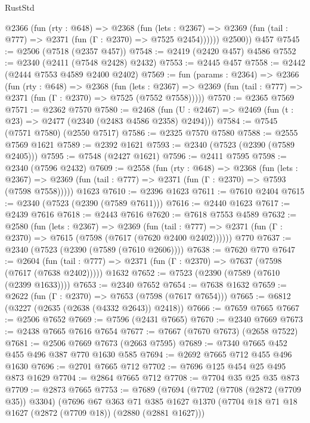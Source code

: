 \begin{lexlean}{RustStd}
\begin{coremodule}
          @2366
            (fun (rty : @648) =>
            @2368
              (fun (lets : @2367) =>
              @2369 (fun (tail : @777) => @2371 (fun (Γ : @2370) => @7525 @2454))))))
        @2500))
    @457
@7545 := @2506 (@7518 (@2357 @457))
@7548 := @2419 (@2420 @457) @4586
@7552 := @2340 (@2411 (@7548 @2428) @2432)
@7553 := @2445 @457
@7558 := @2442 (@2444 @7553 @4589 @2400 @2402)
@7569 := fun (params : @2364) =>
  @2366
    (fun (rty : @648) =>
    @2368
      (fun (lets : @2367) =>
      @2369 (fun (tail : @777) => @2371 (fun (Γ : @2370) => @7525 (@7552 @7558)))))
@7570 := @2365 @7569
@7571 := @2362 @7570
@7580 := @2468 (fun (U : @2467) => @2469 (fun (t : @23) => @2477 (@2340 (@2483 @4586 @2358) @2494)))
@7584 := @7545 (@7571 @7580) (@2550 @7517)
@7586 := @2325 @7570 @7580
@7588 := @2555 @7569 @1621
@7589 := @2392 @1621
@7593 := @2340 (@7523 (@2390 (@7589 @2405)))
@7595 := @7548 (@2427 @1621)
@7596 := @2411 @7595
@7598 := @2340 (@7596 @2432)
@7609 := @2558
    (fun (rty : @648) =>
    @2368
      (fun (lets : @2367) =>
      @2369 (fun (tail : @777) => @2371 (fun (Γ : @2370) => @7593 (@7598 @7558)))))
    @1623
@7610 := @2396 @1623
@7611 := @7610 @2404
@7615 := @2340 (@7523 (@2390 (@7589 @7611)))
@7616 := @2440 @1623
@7617 := @2439 @7616
@7618 := @2443 @7616
@7620 := @7618 @7553 @4589
@7632 := @2580
    (fun (lets : @2367) =>
    @2369
      (fun (tail : @777) => @2371 (fun (Γ : @2370) => @7615 (@7598 (@7617 (@7620 @2400 @2402))))))
    @770
@7637 := @2340 (@7523 (@2390 (@7589 (@7610 @2606))))
@7638 := @7620 @770
@7647 := @2604
    (fun (tail : @777) => @2371 (fun (Γ : @2370) => @7637 (@7598 (@7617 (@7638 @2402)))))
    @1632
@7652 := @7523 (@2390 (@7589 (@7610 (@2399 @1633))))
@7653 := @2340 @7652
@7654 := @7638 @1632
@7659 := @2622 (fun (Γ : @2370) => @7653 (@7598 (@7617 @7654)))
@7665 := @6812 (@3227 (@2635 (@2638 (@4332 @2643)) @2418))
@7666 := @7659 @7665
@7667 := @2506 @7652
@7669 := @7596 (@2431 @7665)
@7670 := @2340 @7669
@7673 := @2438 @7665 @7616 @7654
@7677 := @7667 (@7670 @7673) (@2658 @7522)
@7681 := @2506 @7669 @7673 (@2663 @7595)
@7689 := @7340 @7665 @452 @455 @496 @387 @770 @1630 @585
@7694 := @2692 @7665 @712 @455 @496 @1630
@7696 := @2701 @7665 @712
@7702 := @7696 @125 @454 @25 @495 @873 @1629
@7704 := @2864 @7665 @712
@7708 := @7704 @35 @25 @35 @873
@7709 := @2873 @7665
@7753 := @7689
    (@7694
      (@7702
        (@7708 (@2872 (@7709 @35)) @3304)
        (@7696
          @67
          @363
          @71
          @385
          @1627
          @1370
          (@7704 @18 @71 @18 @1627 (@2872 (@7709 @18)) (@2880 (@2881 @1627)))

\end{coremodule}
\end{lexlean}
